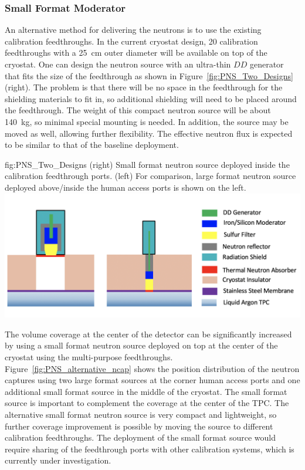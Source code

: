 \label{sec:sp-calib-pns-alt}

\subsubsection{Small Format Moderator}
An alternative method for delivering the neutrons is to use the existing calibration feedthroughs. In the current cryostat design, \num{20} calibration feedthroughs with a \SI{25}{\cm} outer diameter will be available on top of the cryostat. One can design the neutron source with an ultra-thin $DD$ generator that fits the size of the feedthrough as shown in Figure~\ref{fig:PNS_Two_Designs} (right). The problem is that there will be no space in the feedthrough for the shielding materials to fit in, so additional shielding will need to be placed around the feedthrough. The weight of this compact neutron source will be about \SI{140}{\kg}, so minimal special mounting is needed. In addition, the source may be moved as well, allowing further flexibility. The effective neutron flux is expected to be similar to that of the baseline deployment. 

\begin{dunefigure}{fig:PNS_Two_Designs}
{(right) Small format neutron source deployed inside the calibration feedthrough ports. (left) For comparison, large format neutron source deployed above/inside the human access ports is shown on the left.}
\includegraphics[width=16cm]{graphics/PNS_Moderator_Combined.png}
\end{dunefigure}

The volume coverage at the center of the detector can be significantly increased by using a small format neutron source deployed on top at the center of the cryostat using the multi-purpose feedthroughs.  
Figure~\ref{fig:PNS_alternative_ncap} shows the position distribution of the neutron captures using two large format sources at the corner human access ports and one additional small format source in the middle of the cryostat. The small format source is %
important to complement the coverage at the center of the TPC. The alternative small format neutron source is very compact and lightweight, so further coverage improvement is possible by moving the source to different calibration feedthroughs. The deployment of the small format source would require sharing of the feedthrough ports with other calibration systems, which is currently under investigation.

